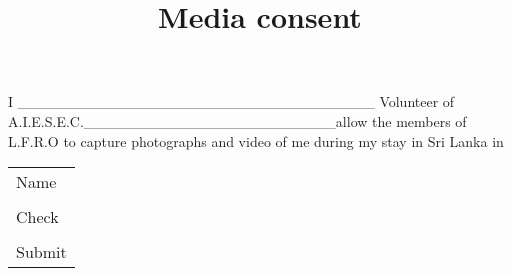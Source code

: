 \documentclass{article}
\begin{document}
	\title{Media consent}
	\maketitle
	
	I __________________________________ Volunteer of A.I.E.S.E.C.________________________allow the members of L.F.R.O to capture photographs and video of me during my stay in Sri Lanka in 
	\\
	\begin{tabular}{l}
	    Name\\\\
	    Check \\\\
	    Submit\\
	\end{tabular}
\end{document}
